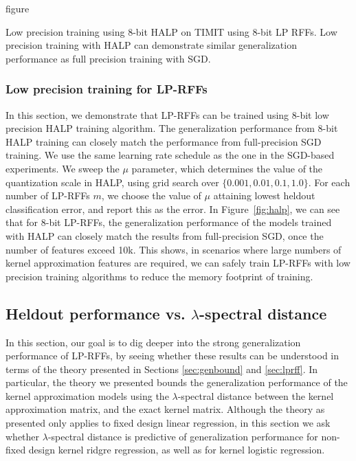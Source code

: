 \begin{table}[ht]
\begin{minipage}{0.35\linewidth}
	\caption{figure}{Low precision training using 8-bit HALP on TIMIT using 8-bit LP RFFs. Low precision training with HALP can demonstrate similar generalization performance as full precision training with SGD.}	
	\label{fig:halp}
\end{minipage}
\end{table}


\subsubsection{Low precision training for LP-RFFs}
\label{sec:halp}
In this section, we demonstrate that LP-RFFs can be trained using 8-bit low precision HALP training algorithm. The generalization performance from 8-bit HALP training can closely match the performance from full-precision SGD training. We use the same learning rate schedule as the one in the SGD-based experiments. We sweep the $\mu$ parameter, which determines the value of the quantization scale in HALP, using grid search over $\{0.001, 0.01, 0.1, 1.0\}$. For each number of LP-RFFs $m$, we choose the value of $\mu$ attaining lowest heldout classification error, and report this as the error. In Figure~\ref{fig:halp}, we can see that for 8-bit LP-RFFs, the generalization performance of the models trained with HALP can closely match the results from full-precision SGD, once the number of features exceed 10k. This shows, in scenarios where large numbers of kernel approximation features are required, we can safely train LP-RFFs with low precision training algorithms to reduce the memory footprint of training.

\subsection{Heldout performance vs. $\lambda$-spectral distance}
In this section, our goal is to dig deeper into the strong generalization performance of LP-RFFs, by seeing whether these results can be understood in terms of the theory presented in Sections \ref{sec:genbound} and \ref{sec:lprff}.  In particular, the theory we presented bounds the generalization performance of the kernel approximation models using the $\lambda$-spectral distance between the kernel approximation matrix, and the exact kernel matrix.  Although the theory as presented only applies to fixed design linear regression, in this section we ask whether $\lambda$-spectral distance is predictive of generalization performance for non-fixed design kernel ridgre regression, as well as for kernel logistic regression.

